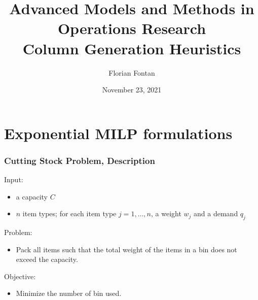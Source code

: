 \documentclass[10pt]{beamer}
\author{Florian Fontan}
\title{Advanced Models and Methods in Operations Research \\ Column Generation Heuristics}
\date{November 23, 2021}
\begin{document}
\newcommand{\customcite}[1]{\citetitle{#1}, \citeauthor{#1}, \citeyear{#1}}


\maketitle

\section{Exponential MILP formulations}

\begin{frame}
  \frametitle{Cutting Stock Problem, Description}

  Input:
  \begin{itemize}
    \item a capacity \alert{$C$}
    \item $n$ item types; for each item type $j = 1, \dots, n$, a weight \alert{$w_j$} and a demand \alert{$q_j$}
  \end{itemize}

  Problem:
  \begin{itemize}
    \item Pack all items such that the total weight of the items in a bin does not exceed the capacity.
  \end{itemize}

  Objective:
  \begin{itemize}
    \item Minimize the number of bin used.
  \end{itemize}
\end{frame}
\end{document}
